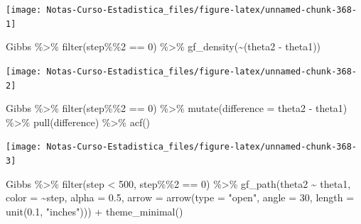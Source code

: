 \documentclass[
  12pt,
]{book}
\newenvironment{Shaded}{\begin{snugshade}}{\end{snugshade}}
\newcommand{\AttributeTok}[1]{\textcolor[rgb]{0.77,0.63,0.00}{#1}}
\newcommand{\DecValTok}[1]{\textcolor[rgb]{0.00,0.00,0.81}{#1}}
\newcommand{\FloatTok}[1]{\textcolor[rgb]{0.00,0.00,0.81}{#1}}
\newcommand{\FunctionTok}[1]{\textcolor[rgb]{0.00,0.00,0.00}{#1}}
\newcommand{\NormalTok}[1]{#1}
\newcommand{\SpecialCharTok}[1]{\textcolor[rgb]{0.00,0.00,0.00}{#1}}
\newcommand{\StringTok}[1]{\textcolor[rgb]{0.31,0.60,0.02}{#1}}
\theoremstyle{definition}
\theoremstyle{definition}
\theoremstyle{definition}
\theoremstyle{definition}
\theoremstyle{remark}
\begin{document}
\begin{center}\texttt{[image: Notas-Curso-Estadistica\_files/figure-latex/unnamed-chunk-368-1]} \end{center}

\begin{Shaded}
\begin{Highlighting}[]
\NormalTok{Gibbs }\SpecialCharTok{\%\textgreater{}\%}
    \FunctionTok{filter}\NormalTok{(step}\SpecialCharTok{\%\%}\DecValTok{2} \SpecialCharTok{==} \DecValTok{0}\NormalTok{) }\SpecialCharTok{\%\textgreater{}\%}
    \FunctionTok{gf\_density}\NormalTok{(}\SpecialCharTok{\textasciitilde{}}\NormalTok{(theta2 }\SpecialCharTok{{-}}\NormalTok{ theta1))}
\end{Highlighting}
\end{Shaded}

\begin{center}\texttt{[image: Notas-Curso-Estadistica\_files/figure-latex/unnamed-chunk-368-2]} \end{center}

\begin{Shaded}
\begin{Highlighting}[]
\NormalTok{Gibbs }\SpecialCharTok{\%\textgreater{}\%}
    \FunctionTok{filter}\NormalTok{(step}\SpecialCharTok{\%\%}\DecValTok{2} \SpecialCharTok{==} \DecValTok{0}\NormalTok{) }\SpecialCharTok{\%\textgreater{}\%}
    \FunctionTok{mutate}\NormalTok{(}\AttributeTok{difference =}\NormalTok{ theta2 }\SpecialCharTok{{-}}\NormalTok{ theta1) }\SpecialCharTok{\%\textgreater{}\%}
    \FunctionTok{pull}\NormalTok{(difference) }\SpecialCharTok{\%\textgreater{}\%}
    \FunctionTok{acf}\NormalTok{()}
\end{Highlighting}
\end{Shaded}

\begin{center}\texttt{[image: Notas-Curso-Estadistica\_files/figure-latex/unnamed-chunk-368-3]} \end{center}

\begin{Shaded}
\begin{Highlighting}[]
\NormalTok{Gibbs }\SpecialCharTok{\%\textgreater{}\%}
    \FunctionTok{filter}\NormalTok{(step }\SpecialCharTok{\textless{}} \DecValTok{500}\NormalTok{, step}\SpecialCharTok{\%\%}\DecValTok{2} \SpecialCharTok{==} \DecValTok{0}\NormalTok{) }\SpecialCharTok{\%\textgreater{}\%}
    \FunctionTok{gf\_path}\NormalTok{(theta2 }\SpecialCharTok{\textasciitilde{}}\NormalTok{ theta1, }\AttributeTok{color =} \SpecialCharTok{\textasciitilde{}}\NormalTok{step, }\AttributeTok{alpha =} \FloatTok{0.5}\NormalTok{,}
        \AttributeTok{arrow =} \FunctionTok{arrow}\NormalTok{(}\AttributeTok{type =} \StringTok{"open"}\NormalTok{, }\AttributeTok{angle =} \DecValTok{30}\NormalTok{, }\AttributeTok{length =} \FunctionTok{unit}\NormalTok{(}\FloatTok{0.1}\NormalTok{,}
            \StringTok{"inches"}\NormalTok{))) }\SpecialCharTok{+} \FunctionTok{theme\_minimal}\NormalTok{()}
\end{Highlighting}
\end{Shaded}
\end{document}
